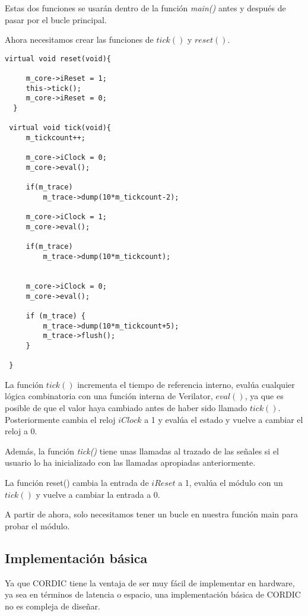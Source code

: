 Estas dos funciones se usarán dentro de la función \textit{main()} antes y después de pasar por el bucle principal.

Ahora necesitamos crear las funciones de $tick()$ y $reset()$.

\begin{lstlisting}[caption={Definición de funciones \textit{reset()} y \textit{tick()}}]
  virtual void reset(void){

     m_core->iReset = 1;
     this->tick();
     m_core->iReset = 0;
  }

 virtual void tick(void){
     m_tickcount++;

     m_core->iClock = 0;
     m_core->eval();
     
     if(m_trace) 
         m_trace->dump(10*m_tickcount-2);

     m_core->iClock = 1;
     m_core->eval();
     
     if(m_trace)
         m_trace->dump(10*m_tickcount);
     

     m_core->iClock = 0;
     m_core->eval();
     
     if (m_trace) {
         m_trace->dump(10*m_tickcount+5);
         m_trace->flush();
     }
     
 }
\end{lstlisting}

La función $tick()$ incrementa el tiempo de referencia interno, evalúa cualquier lógica combinatoria con una función interna de Verilator, $eval()$, ya que es posible de que el valor haya cambiado antes de haber sido llamado $tick()$. Posteriormente cambia el reloj $iClock$ a 1 y evalúa el estado y vuelve a cambiar el reloj a 0.

Además, la función \textit{tick()} tiene unas llamadas al trazado de las señales si el usuario lo ha inicializado con las llamadas apropiadas anteriormente.

La función reset() cambia la entrada de $iReset$ a 1, evalúa el módulo con un $tick()$ y vuelve a cambiar la entrada a 0.

A partir de ahora, solo necesitamos tener un bucle en nuestra función main para probar el módulo.

\subsection{Implementación básica}
Ya que CORDIC tiene la ventaja de ser muy fácil de implementar en hardware, ya sea en términos de latencia o espacio, una implementación básica de CORDIC no es compleja de diseñar.

